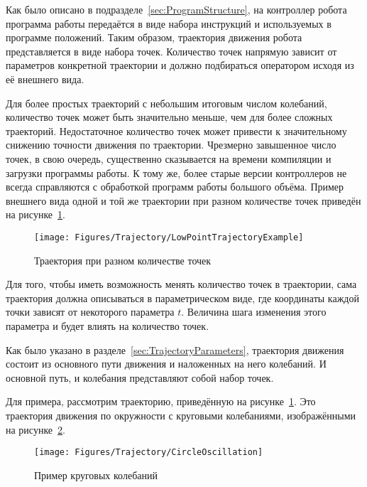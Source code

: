 Как было описано в подразделе~\ref{sec:ProgramStructure}, на контроллер робота программа работы передаётся в виде набора инструкций и используемых в программе положений.
Таким образом, траектория движения робота представляется в виде набора точек.
Количество точек напрямую зависит от параметров конкретной траектории и должно подбираться оператором исходя из её внешнего вида.

Для более простых траекторий с небольшим итоговым числом колебаний, количество точек может быть значительно меньше, чем для более сложных траекторий.
Недостаточное количество точек может привести к значительному снижению точности движения по траектории.
Чрезмерно завышенное число точек, в свою очередь, существенно сказывается на времени компиляции и загрузки программы работы.
К тому же, более старые версии контроллеров не всегда справляются с обработкой программ работы большого объёма.
Пример внешнего вида одной и той же траектории при разном количестве точек приведён на рисунке~\ref{fig:Trajectory:LowPointTrajectoryExample}.

\begin{figure}[H]
    \centering
    \vspace{14pt}
    \texttt{[image: Figures/Trajectory/LowPointTrajectoryExample]}
    \caption{Траектория при разном количестве точек}
    \label{fig:Trajectory:LowPointTrajectoryExample}
\end{figure}

Для того, чтобы иметь возможность менять количество точек в траектории, сама траектория должна описываться в параметрическом виде, где координаты каждой точки зависят от некоторого параметра $t$.
Величина шага изменения этого параметра и будет влиять на количество точек.

Как было указано в разделе~\ref{sec:TrajectoryParameters}, траектория движения состоит из основного пути движения и наложенных на него колебаний.
И основной путь, и колебания представляют собой набор точек.

Для примера, рассмотрим траекторию, приведённую на рисунке~\ref{fig:Trajectory:LowPointTrajectoryExample}.
Это траектория движения по окружности с круговыми колебаниями, изображёнными на рисунке~\ref{fig:Trajectory:CircleOscillation}.

\begin{figure}[H]
    \centering
    \vspace{14pt}
    \texttt{[image: Figures/Trajectory/CircleOscillation]}
    \caption{Пример круговых колебаний}
    \label{fig:Trajectory:CircleOscillation}
\end{figure}

